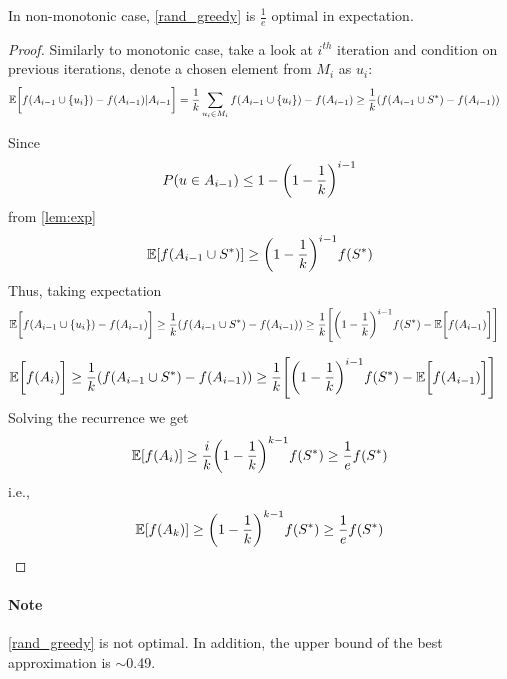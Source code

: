 \begin{theorem}
	In non-monotonic case, \vref{rand_greedy} is $\frac{1}{e}$ optimal in expectation.
	\begin{proof}
		Similarly to monotonic case, take a look at $i^{th}$ iteration and condition on previous iterations, denote a chosen element from $M_i$ as $u_i$:
		\begin{align}
		\mathbb{E} \qty\bigg[f(A_{i-1} \cup \qty{u_i}) - f(A_{i-1}) | A_{i-1} ] &= \frac{1}{k} \sum_{u_i \in M_i} f(A_{i-1} \cup \qty{u_i}) - f(A_{i-1}) \geq \frac{1}{k} \qty(f(A_{i-1} \cup S^*) - f(A_{i-1}) )
		\end{align}
		
		
		Since
		\begin{align}
		P(u\in A_{i-1}) \leq 1 - \qty(1-\frac{1}{k})^{i-1}
		\end{align}
		from \vref{lem:exp}
		\begin{align}
		\mathbb{E}\qty[f(A_{i-1} \cup S^*)] \geq \qty(1-\frac{1}{k})^{i-1}f(S^*)
		\end{align}
		Thus, taking expectation		
		\begin{align}
		\mathbb{E} \qty\bigg[f(A_{i-1} \cup \qty{u_i}) - f(A_{i-1}) ] &\geq \frac{1}{k} \qty(f(A_{i-1} \cup S^*) - f(A_{i-1}) ) \geq \frac{1}{k}  \qty[\qty(1-\frac{1}{k})^{i-1}f(S^*) - \mathbb{E} \qty\bigg[f(A_{i-1})] ]
		\end{align}
			
		\begin{align}
		\mathbb{E} \qty\bigg[f(A_{i} )] &\geq \frac{1}{k} \qty(f(A_{i-1} \cup S^*) - f(A_{i-1}) ) \geq \frac{1}{k}  \qty[\qty(1-\frac{1}{k})^{i-1}f(S^*) - \mathbb{E} \qty\bigg[f(A_{i-1})] ]
		\end{align}
		Solving the recurrence we get
		\begin{align}
		\mathbb{E} \qty[f(A_i)] \geq \frac{i}{k} \qty(1-\frac{1}{k})^{k-1} f(S^*) \geq \frac{1}{e}f(S^*) 
		\end{align}
		i.e.,
		\begin{align}
		\mathbb{E} \qty[f(A_k)] \geq  \qty(1-\frac{1}{k})^{k-1} f(S^*) \geq \frac{1}{e}f(S^*) 
		\end{align}
		
		
	\end{proof}
\end{theorem}

\paragraph{Note} \vref{rand_greedy} is not optimal. In addition, the upper bound of the best approximation is $\sim$0.49.
